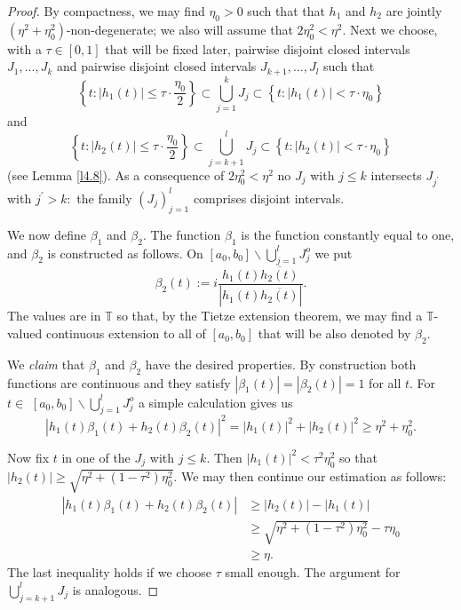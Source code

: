 \documentclass[12pt,fleqn]{amsart}
\theoremstyle{definition}
\numberwithin{equation}{section}
\theoremstyle{remark}
\begin{document}
\begin{proof}
    By compactness, we may find $\eta_{0}>0$ such that that $h_1$ and $h_2$ are jointly $(\eta^{2}+\eta_{0}^{2})$-non-degenerate; we also will assume that $2 \eta_{0}^{2}<\eta^{2}$. Next we choose, with a $\tau \in[0,1]$ that will be fixed later, pairwise disjoint closed intervals $J_{1}, \ldots, J_{k}$ and pairwise disjoint closed intervals $J_{k+1}, \ldots, J_{l}$ such that
    \[ 
    \left\{t\colon |h_{1}(t)| \leqslant \tau\cdot \frac{\eta_{0}}{2}\right\} \subset \bigcup_{j=1}^{k} J_{j} \subset\left\{t\colon |h_{1}(t)|<\tau\cdot \eta_{0}\right\}
    \]
and
    \[ 
    \left\{t\colon |h_{2}(t)| \leqslant \tau\cdot \frac{\eta_{0}}{2}\right\} \subset \bigcup_{j=k+1}^{l} J_{j} \subset\left\{t\colon |h_{2}(t)|<\tau \cdot \eta_{0}\right\}
    \]
    (see Lemma \ref{l4.8}). As a consequence of $2 \eta_{0}^{2}<\eta^{2}$ no $J_{j}$ with $j \leqslant k$ intersects  $J_{j^{\prime}}$ with $j^{\prime}>k\colon$ the family $\left(J_{j}\right)_{j=1}^l$ comprises disjoint intervals.

    We now define $\beta_{1}$ and $\beta_{2}$. The function $\beta_{1}$ is the function constantly equal to one, and $\beta_{2}$ is constructed as follows. On $\left[a_{0}, b_{0}\right] \backslash \bigcup_{j=1}^{l} J_{j}^{o}$ we put
    \[
        \beta_{2}(t):=i \frac{h_{1}(t) \overline{h_{2}(t)}}{\left|h_{1}(t) \overline{h_{2}(t)}\right|}.
    \]
     The values are in $\mathbb{T}$ so that, by the Tietze extension theorem, we may find a $\mathbb{T}$-valued continuous extension to all of $\left[a_{0}, b_{0}\right]$ that will be also denoted by $\beta_{2}$.\smallskip

    We \emph{claim} that $\beta_{1}$ and $\beta_{2}$ have the desired properties. By construction both functions are continuous and they satisfy $\left|\beta_{1}(t)\right|=\left|\beta_{2}(t)\right|=1$ for all $t$. For $t \in$ $\left[a_{0}, b_{0}\right] \backslash \bigcup_{j=1}^{l} J_{j}^{o}$ a simple calculation gives us
    \[ 
    \left|h_{1}(t) \beta_{1}(t)+h_{2}(t) \beta_{2}(t)\right|^{2}=\left|h_{1}(t)\right|^{2}+\left|h_{2}(t)\right|^{2}\geqslant\eta^{2} + \eta_0^{2} .
    \]

    Now fix $t$ in one of the $J_{j}$ with $j \leqslant k$. Then $\left|h_{1}(t)\right|^{2}<\tau^{2} \eta_{0}^{2}$ so that $\left|h_{2}(t)\right| \geqslant \sqrt{\eta^{2}+\left(1-\tau^{2}\right) \eta_{0}^{2}}$. We may then continue our estimation as follows:
    \[ 
        \begin{split}
        \left|h_{1}(t) \beta_{1}(t)+h_{2}(t) \beta_{2}(t)\right| 
        & \geqslant \left|h_{2}(t)\right|-\left|h_{1}(t)\right| \\
        & \geqslant \sqrt{\eta^{2}+\left(1-\tau^{2}\right) \eta_{0}^{2}}-\tau \eta_{0} \\
        & \geqslant \eta.
        \end{split}
    \]
 The last inequality holds if we choose $\tau$ small enough. The argument for $\bigcup_{j=k+1}^{l} J_{j}$ is analogous.
\end{proof}
\end{document}
